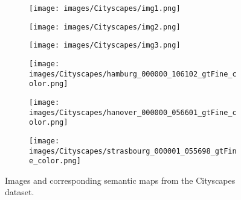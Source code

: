 \documentclass[10pt,twocolumn,letterpaper]{article}
\begin{document}
\begin{figure}[t]
    \centering
    \begin{adjustbox}{width=\columnwidth}
    \begin{subfigure}[b]{1.0\textwidth}
        \texttt{[image: images/Cityscapes/img1.png]}
    \end{subfigure}
    \hspace{0.01cm}
    \begin{subfigure}[b]{1.0\textwidth}
        \texttt{[image: images/Cityscapes/img2.png]}
    \end{subfigure}
    \hspace{0.01cm}
    \begin{subfigure}[b]{1.0\textwidth}
        \texttt{[image: images/Cityscapes/img3.png]}
    \end{subfigure}
    \end{adjustbox}
    
    \begin{adjustbox}{width=\columnwidth}
    \begin{subfigure}[b]{1.0\textwidth}
        \texttt{[image: images/Cityscapes/hamburg\_000000\_106102\_gtFine\_color.png]}
    \end{subfigure}
    \hspace{0.01cm}
    \begin{subfigure}[b]{1.0\textwidth}
        \texttt{[image: images/Cityscapes/hanover\_000000\_056601\_gtFine\_color.png]}
    \end{subfigure}
    \hspace{0.01cm}
    \begin{subfigure}[b]{1.0\textwidth}
        \texttt{[image: images/Cityscapes/strasbourg\_000001\_055698\_gtFine\_color.png]}
    \end{subfigure}
    \end{adjustbox}
    \caption{Images and corresponding semantic maps from the Cityscapes dataset.}
    \label{fig:cityscapes}
\end{figure}
\end{document}
